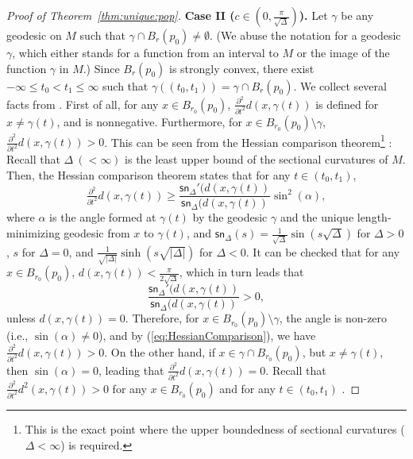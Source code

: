 \documentclass[preprint]{imsart}
\theoremstyle{plain}
\theoremstyle{remark}
\begin{document}
\begin{appendix}
\begin{proof}[Proof of Theorem~\ref{thm:unique:pop}]
\textbf{Case II ($c \in (0,\tfrac{\pi}{\sqrt{\Delta}})$).} 
Let $\gamma$ be any geodesic on $M$ such that $\gamma \cap B_r(p_0) \neq \emptyset$. (We abuse the notation for a geodesic $\gamma$, which either stands for a function from an interval to $M$ or the image of the function $\gamma$ in $M$.) Since $B_r(p_0)$ is strongly convex, there exist $-\infty\le t_0<t_1 \le \infty$ such that $\gamma((t_0,t_1)) = \gamma \cap B_r(p_0)$.
We collect several facts from \cite{karcher1977riemannian,petersen2006riemannian,fletcher2009geometric,afsari2011riemannian}. 
%
%
%
First of all, for any $x \in B_{r_0}(p_0)$, $\tfrac{\partial^2}{\partial t^2} d(x,\gamma(t))$ is defined for $x \neq \gamma(t)$, and is nonnegative. 
Furthermore, for $x \in B_{r_0}(p_0) \setminus \gamma$, 
$  \tfrac{\partial^2}{\partial t^2} d(x,\gamma(t)) > 0$. This can be seen from the Hessian comparison theorem\footnote{This is the exact point where the upper boundedness of sectional curvatures ($\Delta < \infty$) is required.} \citep[see, e.g.,][]{afsari2011riemannian}: Recall that $\Delta ~(< \infty)$ is the least upper bound of the sectional curvatures of $M$. Then, the Hessian comparison theorem states that for any $t \in (t_0,t_1)$, 
\begin{equation}
    \label{eq:HessianComparison} \tfrac{\partial^2}{\partial t^2} d(x,\gamma(t)) \ge \frac{\textsf{sn}_{\Delta}'(d(x,\gamma(t))}{\textsf{sn}_{\Delta}(d(x,\gamma(t))} \sin^2(\alpha),
\end{equation} 
where $\alpha$ is the angle formed at $\gamma(t)$ by the geodesic $\gamma$ and the unique length-minimizing geodesic from $x$ to $\gamma(t)$, and 
$\textsf{sn}_{\Delta}(s) = \tfrac{1}{\sqrt{\Delta} }\sin (s\sqrt{\Delta} )$ for $\Delta >0$, 
$s$ for $\Delta =0$, and $\tfrac{1}{\sqrt{|\Delta|} }\sinh (s\sqrt{|\Delta|} )$ for $\Delta <0$. It can be checked that for any $x \in B_{r_0}(p_0)$, $d(x,\gamma(t)) < \tfrac{\pi}{2\sqrt{\Delta}}$, which in turn leads that 
$$
\frac{\textsf{sn}_{\Delta}'(d(x,\gamma(t))}{\textsf{sn}_{\Delta}(d(x,\gamma(t))} > 0, 
$$
unless $d(x,\gamma(t)) = 0$. 
Therefore,  for $x \in B_{r_0}(p_0) \setminus \gamma$, the angle is non-zero (i.e., $\sin(\alpha) \neq 0$), and by (\ref{eq:HessianComparison}), we have 
$  \tfrac{\partial^2}{\partial t^2} d(x,\gamma(t)) > 0$.
%
On the other hand, if $x \in \gamma \cap B_{r_0}(p_0)$, but $x \neq \gamma(t)$, then 
$\sin(\alpha) = 0$, leading that 
 $  \tfrac{\partial^2}{\partial t^2} d(x,\gamma(t)) = 0$. 
Recall that  $ \tfrac{\partial^2}{\partial t^2} d^2(x,\gamma(t))> 0$ for any $x \in B_{r_0}(p_0)$ and for any $t \in (t_0,t_1)$ \citep{karcher1977riemannian}.


\end{proof}
\end{appendix}
\end{document}
